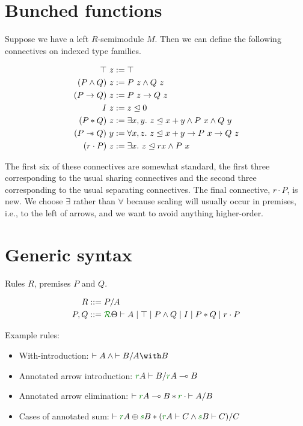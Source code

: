 \documentclass[a4paper]{article}
\begin{document}
\section{Bunched functions}

Suppose we have a left $R$-semimodule $M$.
Then we can define the following connectives on indexed type families.

\begin{align*}
  \top~z &:= \top \\
  (P \wedge Q)~z &:= P~z \wedge Q~z \\
  (P \to Q)~z &:= P~z \to Q~z \\
  I~z &:= z \trianglelefteq 0 \\
  (P * Q)~z &:= \exists x,y.~z \trianglelefteq x+y \wedge P~x \wedge Q~y \\
  (P \mathrel{\mathord{-}\hspace{-0.75ex}*} Q)~y &:= \forall x,z.~z \trianglelefteq x+y \to P~x \to Q~z \\
  (r \cdot P)~z &:= \exists x.~z \trianglelefteq rx \wedge P~x
\end{align*}

The first six of these connectives are somewhat standard, the first three
corresponding to the usual sharing connectives and the second three
corresponding to the usual separating connectives.
The final connective, $r \cdot P$, is new.
We choose $\exists$ rather than $\forall$ because scaling will usually occur in
premises, i.e., to the left of arrows, and we want to avoid anything
higher-order.

\section{Generic syntax}

Rules $R$, premises $P$ and $Q$.

\begin{align*}
  R &::= P/A \\
  P,Q &::= \ctx \Theta R \vdash A \mid \top \mid P \wedge Q \mid I \mid P * Q
        \mid r \cdot P
\end{align*}

Example rules:

\begin{itemize}
  \item With-introduction: ${\vdash A} \wedge {\vdash B} / \withT{A}{B}$
  \item Annotated arrow introduction:
    ${\rescomment rA \vdash B} / \fun{\rescomment rA}{B}$
  \item Annotated arrow elimination:
    ${\vdash \fun{\rescomment rA}{B}} * \rescomment r \cdot {\vdash A} / B$
  \item Cases of annotated sum:
    ${\vdash \sumT{\rescomment rA}{\rescomment sB}}
    * ({\rescomment rA \vdash C} \wedge {\rescomment sB \vdash C}) / C$
\end{itemize}
\end{document}

